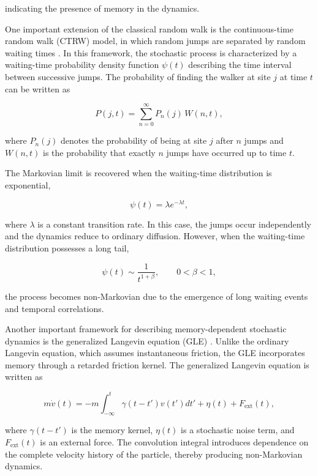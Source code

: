 indicating the presence of memory in the dynamics.

One important extension of the classical random walk is the continuous-time random walk (CTRW) model\cite{klafter2011}, in which random jumps are separated by random waiting times \cite{klafter2011}. In this framework, the stochastic process is characterized by a waiting-time probability density function $\psi(t)$ describing the time interval between successive jumps. The probability of finding the walker at site $j$ at time $t$ can be written as

\begin{equation}
P(j,t)
=
\sum_{n=0}^{\infty}
P_n(j)\,W(n,t),
\end{equation}

where $P_n(j)$ denotes the probability of being at site $j$ after $n$ jumps and $W(n,t)$ is the probability that exactly $n$ jumps have occurred up to time $t$.

The Markovian limit is recovered when the waiting-time distribution is exponential,

\begin{equation}
\psi(t)=\lambda e^{-\lambda t},
\end{equation}

where $\lambda$ is a constant transition rate. In this case, the jumps occur independently and the dynamics reduce to ordinary diffusion. However, when the waiting-time distribution possesses a long tail,

\begin{equation}
\psi(t)\sim \frac{1}{t^{1+\beta}},
\qquad
0<\beta<1,
\end{equation}

the process becomes non-Markovian due to the emergence of long waiting events and temporal correlations.

Another important framework for describing memory-dependent stochastic dynamics is the generalized Langevin equation (GLE) \cite{balakrishnan2021}. Unlike the ordinary Langevin equation, which assumes instantaneous friction, the GLE incorporates memory through a retarded friction kernel. The generalized Langevin equation is written as\cite{balakrishnan2021}

\begin{equation}
m\dot{v}(t)
=
-m\int_{-\infty}^{t}
\gamma(t-t')v(t')dt'
+
\eta(t)
+
F_{\mathrm{ext}}(t),
\end{equation}

where $\gamma(t-t')$ is the memory kernel, $\eta(t)$ is a stochastic noise term, and $F_{\mathrm{ext}}(t)$ is an external force. The convolution integral introduces dependence on the complete velocity history of the particle, thereby producing non-Markovian dynamics.

